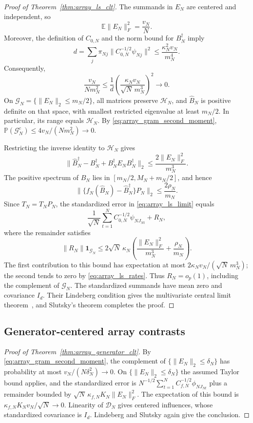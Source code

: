 \documentclass[pdflatex,iicol,sn-mathphys-ay]{sn-jnl}
\theoremstyle{thmstyleone}
\theoremstyle{thmstylethree}
\theoremstyle{thmstyletwo}
\begin{document}
\begin{proof}[Proof of Theorem~{\upshape\ref{thm:array_ls_clt}}]
The summands in \(E_N\) are centered and independent, so
\begin{equation}
 \mathbb E\|E_N\|_F^2=\frac{v_N}{N}.
 \label{eq:array_gram_second_moment}
\end{equation}
Moreover, the definition of \(C_{0,N}\) and the norm bound for
\(B_N^\dagger\) imply
\[
 d=\sum_j\pi_{Nj}\|C_{0,N}^{-1/2}\psi_{Nj}\|^2
 \le \frac{\kappa_N^2v_N}{m_N^4}.
\]
Consequently,
\[
 \frac{v_N}{Nm_N^2}
 \le \frac1d\left(\frac{\kappa_Nv_N}{\sqrt N\,m_N^3}\right)^2
 \longrightarrow0.
\]
On \(\mathcal G_N=\{\|E_N\|_2\le m_N/2\}\), all matrices preserve
\(\mathcal H_N\), and \(\widehat B_N\) is positive definite on that space,
with smallest restricted eigenvalue at least \(m_N/2\).
In particular, its range equals \(\mathcal H_N\). By
\eqref{eq:array_gram_second_moment},
\(\mathbb P(\mathcal G_N^c)\le4v_N/(Nm_N^2)\to0\).

Restricting the inverse identity to \(\mathcal H_N\) gives
\[
 \|\widehat B_N^\dagger-B_N^\dagger
       +B_N^\dagger E_NB_N^\dagger\|_2
 \le \frac{2\|E_N\|_F^2}{m_N^3}.
\]
The positive spectrum of \(\widehat B_N\) lies in
\([m_N/2,M_N+m_N/2]\), and hence
\[
 \|\{f_N(\widehat B_N)-\widehat B_N^\dagger\}P_N\|_2
 \le \frac{2\rho_N}{m_N}.
\]
Since \(T_N=T_NP_N\), the standardized error in
\eqref{eq:array_ls_limit} equals
\[
 \frac1{\sqrt N}\sum_{t=1}^N C_{0,N}^{-1/2}\psi_{NJ_{Nt}}+R_N,
 \]
where the remainder satisfies
\[
 \|R_N\|\mathbf{1}_{\mathcal G_N}
 \le2\sqrt N\,\kappa_N
       \left(\frac{\|E_N\|_F^2}{m_N^3}+\frac{\rho_N}{m_N}\right).
\]
The first contribution to this bound has expectation at most
\(2\kappa_Nv_N/(\sqrt N\,m_N^3)\); the second tends to zero by
\eqref{eq:array_ls_rates}. Thus \(R_N=o_p(1)\), including the complement
of \(\mathcal G_N\). The standardized summands have mean zero and
covariance \(I_d\). Their Lindeberg condition gives the multivariate
central limit theorem~\citep[Proposition~2.27]{vandervaart1998asymptotic},
and Slutsky's theorem completes the proof.
\end{proof}

\subsection{Generator-centered array contrasts}
\label{app:proof-array-generator}

\begin{proof}[Proof of Theorem~{\upshape\ref{thm:array_generator_clt}}]
By \eqref{eq:array_gram_second_moment}, the complement of
\(\{\|E_N\|_2\le\delta_N\}\) has probability at most
\(v_N/(N\delta_N^2)\to0\). On \(\{\|E_N\|_2\le\delta_N\}\) the assumed Taylor bound applies,
and the standardized error is
\(N^{-1/2}\sum_{t=1}^N C_{f,N}^{-1/2}\phi_{NJ_{Nt}}\) plus a remainder
bounded by \(\sqrt N\,\kappa_{f,N}K_N\|E_N\|_F^2\).
The expectation of this bound is
\(\kappa_{f,N}K_Nv_N/\sqrt N\to0\).
Linearity of \(\mathcal D_N\) gives centered influences, whose standardized
covariance is \(I_d\). Lindeberg and Slutsky again give the conclusion.
\end{proof}

\setlength{\bibsep}{3pt plus1pt minus0.5pt}

\end{document}
